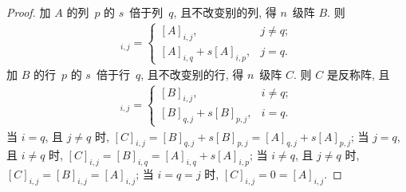 \documentclass[../libro.tex]{subfiles}
\begin{document}
\begin{proof}
    加 \(A\) 的列~\(p\) 的 \(s\)~倍于列~\(q\),
    且不改变别的列, 得 \(n\)~级阵 \(B\).
    则
    \begin{align*}
        [B]_{i,j} =
        \begin{cases}
            [A]_{i,j},              & j \neq q; \\
            [A]_{i,q} + s[A]_{i,p}, & j = q.
        \end{cases}
    \end{align*}
    加 \(B\) 的行~\(p\) 的 \(s\)~倍于行~\(q\),
    且不改变别的行, 得 \(n\)~级阵 \(C\).
    则 \(C\) 是反称阵, 且
    \begin{align*}
        [C]_{i,j} =
        \begin{cases}
            [B]_{i,j},              & i \neq q; \\
            [B]_{q,j} + s[B]_{p,j}, & i = q.
        \end{cases}
    \end{align*}
    当 \(i = q\), 且 \(j \neq q\) 时,
    \(
        [C]_{i,j}
        = [B]_{q,j} + s[B]_{p,j}
    = [A]_{q,j} + s[A]_{p,j}\);
    当 \(j = q\), 且 \(i \neq q\) 时,
    \(
        [C]_{i,j}
        = [B]_{i,q}
    = [A]_{i,q} + s[A]_{i,p}\);
    当 \(i \neq q\), 且 \(j \neq q\) 时,
    \([C]_{i,j} = [B]_{i,j} = [A]_{i,j}\);
    当 \(i = q = j\) 时,
    \([C]_{i,j} = 0 = [A]_{i,j}\).

\end{proof}
\end{document}
